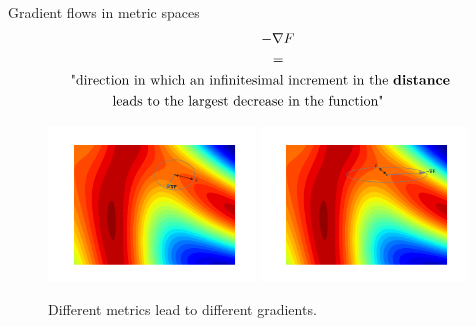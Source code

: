 \documentclass{beamer}
\begin{document}
\begin{frame}{Gradient flows in metric spaces}
\begin{align*}
    -\nabla& F\\
    =&\\
    \text{"direction in which an infinitesimal}& \text{ increment in the \textbf{distance}}\\
    \text{leads to the largest decrease}& \text{ in the function"}
\end{align*}
\begin{figure}
    \centering
    \includegraphics[width=0.49\textwidth]{Euclidean_gradient.png}
    \includegraphics[width=0.49\textwidth]{Riemannian_gradient.png}
    \caption{Different metrics lead to different gradients.}
    \end{figure}
\end{frame}
\end{document}
